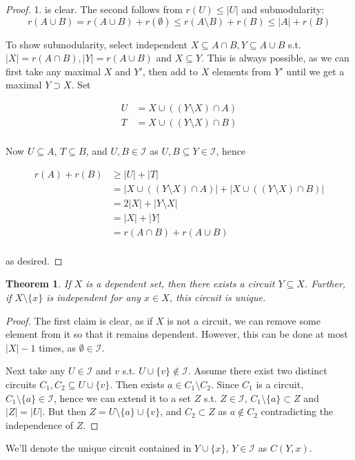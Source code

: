 \documentclass{article}
\newtheorem{theorem}{Theorem}[section]
\begin{document}
\begin{proof}
1. is clear. The second follows from $r(U) \leq |U|$ and submodularity:
\begin{equation*}
r(A \cup B) = r(A \cup B) + r(\emptyset) \leq r(A \setminus B) + r(B) \leq |A| + r(B)
\end{equation*}

To show submodularity, select independent $X \subseteq A \cap B, Y \subseteq A \cup B$ s.t. $|X| = r(A \cap B), |Y| = r(A \cup B)$
and $X \subseteq Y$. This is always possible, as we can first take any maximal $X$ and $Y'$, then add to $X$ elements from $Y'$ until we get a maximal $Y \supset X$. Set

\begin{align*}
U &= X \cup ((Y \setminus X) \cap A)\\
T &= X \cup ((Y \setminus X) \cap B)\\
\end{align*}

Now $U \subseteq A$, $T \subseteq B$, and $U, B \in \mathcal{I}$ as $U, B \subseteq Y \in \mathcal{I}$, hence

\begin{align*}
r(A) + r(B)	&\geq |U| + |T|\\
		&= |X \cup ((Y \setminus X) \cap A)| + |X \cup ((Y \setminus X) \cap B)|\\
		&= 2|X| + |Y \setminus X|\\
		&= |X| + |Y|\\
		&= r(A \cap B) + r(A \cup B)\\
\end{align*}

as desired.
\end{proof}

\begin{theorem}
If $X$ is a dependent set, then there exists a circuit $Y \subseteq X$. Further, if $X \setminus \{x\}$ is independent for any $x \in X$, this circuit is unique.
\end{theorem}
\begin{proof}
The first claim is clear, as if $X$ is not a circuit, we can remove some element from it so that it remains dependent. However, this can be done
at most $|X| - 1$ times, as $\emptyset \in \mathcal{I}$.

Next take any $U \in \mathcal{I}$ and $v$ s.t. $U \cup \{v\} \not\in \mathcal{I}$. Assume there exist two distinct circuits $C_{1}, C_{2} \subseteq U \cup \{v\}$.
Then exists $a \in C_{1} \setminus C_{2}$. Since $C_{1}$ is a circuit, $C_{1} \setminus \{a\} \in \mathcal{I}$, hence we can extend it to a set $Z$
s.t. $Z \in \mathcal{I}$, $C_{1} \setminus \{a\} \subset Z$ and $|Z| = |U|$. But then $Z = U \setminus \{a\} \cup \{v\}$, and $C_{2} \subset Z$ as $a \not\in C_{2}$
contradicting the independence of $Z$.
\end{proof}
We'll denote the unique circuit contained in $Y \cup \{x\}$, $Y \in \mathcal{I}$ as $C(Y, x)$.
\end{document}
